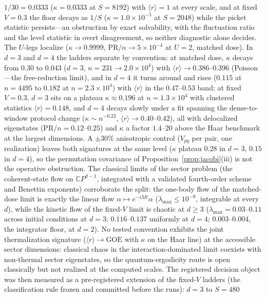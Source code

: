 \begin{remark}
$1/30=0.0333$ ($\kappa=0.0333$ at $S=8192$) with $\langle r\rangle=1$ at
every scale, and at fixed $V=0.3$ the floor decays as $1/S$ ($\kappa=
1.0\times10^{-5}$ at $S=2048$) while the picket statistic persists---an
obstruction by exact solvability, with the fluctuation ratio and the level
statistic in overt disagreement, so neither diagnostic alone decides. The
$U$-legs localize ($\kappa\to0.9999$, $\mathrm{PR}/n\to5\times10^{-4}$ at
$U=2$, matched dose). In $d=3$ and $d=4$ the ladders separate by
convention: at matched dose, $\kappa$ decays from $0.30$ to $0.043$
($d=3$, $n=231\to2.0\times10^{4}$) with $\langle r\rangle\to0.386$--$0.396$
(Poisson---the free-reduction limit), and in $d=4$ it turns around and
rises ($0.115$ at $n=4495$ to $0.182$ at $n=2.3\times10^{4}$) with
$\langle r\rangle$ in the $0.47$--$0.53$ band; at fixed $V=0.3$, $d=3$
sits on a plateau $\kappa\approx0.196$ at $n=1.3\times10^{4}$ with
clustered statistics $\langle r\rangle=0.148$, and $d=4$ decays slowly
under a fit spanning the dense-to-window protocol change
($\kappa\sim n^{-0.22}$, $\langle r\rangle\to0.40$--$0.42$), all with
delocalized eigenstates ($\mathrm{PR}/n=0.12$--$0.25$) and $\kappa$ a
factor $1.4$--$20$ above the Haar benchmark at the largest dimensions. A
$\pm30\%$ anisotropic control ($V_{pq}$ per pair, one realization) leaves
both signatures at the same level ($\kappa$ plateau $0.28$ in $d=3$,
$0.15$ in $d=4$), so the permutation covariance of
Proposition~\ref{prop:jacobi}(iii) is not the operative obstruction. The
classical limits of the sector problem (the coherent-state flow on
$\mathbb{C}P^{d-1}$, integrated with a validated fourth-order scheme and
Benettin exponents) corroborate the split: the one-body flow of the
matched-dose limit is exactly the linear flow
$\alpha\mapsto e^{-iMt}\alpha$ ($\lambda_{\max}\le10^{-9}$, integrable at
every $d$), while the kinetic flow of the fixed-$V$ limit is chaotic at
$d\ge3$ ($\lambda_{\max}=0.03$--$0.11$ across initial conditions at $d=3$;
$0.116$--$0.137$ uniformly at $d=4$; $0.003$--$0.004$, the integrator
floor, at $d=2$). No tested convention exhibits the joint thermalization
signature ($\langle r\rangle\to\mathrm{GOE}$ with $\kappa$ on the Haar
line) at the accessible sector dimensions: classical chaos in the
interaction-dominated limit coexists with non-thermal sector eigenstates,
so the quantum-ergodicity route is open classically but not realized at
the computed scales. The registered decision object was then measured as
a pre-registered extension of the fixed-$V$ ladders (the classification
rule frozen and committed before the runs): $d=3$ to $S=480$

\end{remark}

